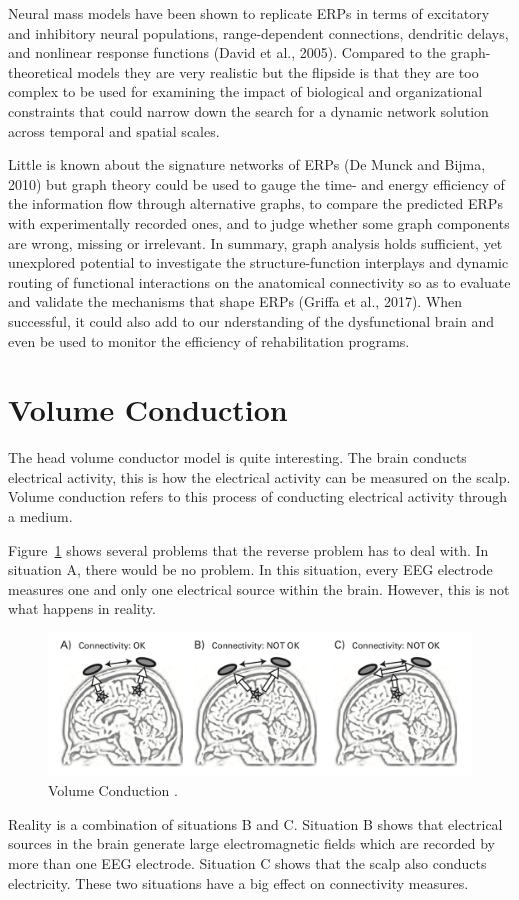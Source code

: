 Neural mass models have been shown to replicate ERPs in terms of excitatory and inhibitory neural populations, range-dependent connections, dendritic delays, and nonlinear response functions (David et al., 2005). Compared to the graph-theoretical models they are very realistic but the flipside is that they are too complex to be used for examining the impact of biological and organizational constraints that could narrow down the search for a dynamic network solution across temporal and spatial scales.

Little is known about the signature networks of ERPs (De Munck and Bijma, 2010) but graph theory could be used to gauge the time- and energy efficiency of the information flow through alternative graphs, to compare the predicted ERPs with experimentally recorded ones, and to judge whether some graph components are wrong, missing or irrelevant. In summary, graph analysis holds sufficient, yet unexplored potential to investigate the structure-function interplays and dynamic routing of functional interactions on the anatomical connectivity so as to evaluate and validate the mechanisms that shape ERPs (Griffa et al., 2017). When successful, it could also add to our nderstanding of the dysfunctional brain and even be used to monitor the efficiency of rehabilitation programs.

\section{Volume Conduction}

The head volume conductor model is quite interesting. The brain conducts electrical activity, this is how the electrical activity can be measured on the scalp. Volume conduction refers to this process of conducting electrical activity through a medium. 

Figure~\ref{conduction} shows several problems that the reverse problem has to deal with. In situation A, there would be no problem. In this situation, every EEG electrode measures one and only one electrical source within the brain. However, this is not what happens in reality. 

\begin{figure}[!htb]
\caption{Volume Conduction \cite{cohen2014analyzing}.}
\label{conduction}
    \centering
    \includegraphics[width=\textwidth]{fig/conduction}
\end{figure}

Reality is a combination of situations B and C. Situation B shows that electrical sources in the brain generate large electromagnetic fields which are recorded by more than one EEG electrode. Situation C shows that the scalp also conducts electricity. These two situations have a big effect on connectivity measures.
